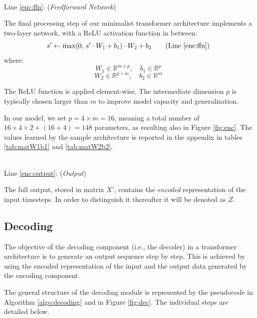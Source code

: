 \documentclass[algorithms,article,submit,pdftex,moreauthors]{Definitions/mdpi}
\begin{document}
~\\Line \ref{enc:ffn}: (\textit{Feedforward Network})

The final processing step of our minimalist transformer architecture implements a two-layer network, with a ReLU activation function in between:
\begin{equation}
    s' \leftarrow \text{max}(0,\,s'\cdot W_1 + b_1) \cdot W_2 + b_2
\tag{Line \ref{enc:ffn}}
\end{equation}
where:
$$
    W_1 \in \mathbb{R}^{m \times p},\quad
    b_1 \in \mathbb{R}^{p}
$$ $$
    W_2 \in \mathbb{R}^{p \times m},\quad
    b_2 \in \mathbb{R}^m
$$

The ReLU function is applied element-wise. The intermediate dimension $p$ is typically chosen larger than $m$ to improve model capacity and generalization. 

In our model, we set $p = 4 \times m = 16$, meaning a total number of $16 \times 4 \times 2 + (16 + 4) = 148$ parameters, as resulting also in Figure \ref{fig:enc}.
The values learned by the sample architecture is reported in the appendix in tables \ref{tab:matW1b1} and \ref{tab:matW2b2}.

~\\Line \ref{enc:output}: (\textit{Output})

The full output, stored in matrix $X'$, contains the \textit{encoded} representation of the input timesteps. In order to distinguish it thereafter it will be denoted as $Z$. 

\subsection{Decoding} \label{subsec:decoding}

The objective of the decoding component (i.e., the decoder) in a transformer architecture is to generate an output sequence step by step. This is achieved by using the encoded representation of the input and the output data generated by the encoding component.

The general structure of the decoding module is represented by the pseudocode in Algorithm \ref{algo:decoding} and in Figure \ref{fig:dec}. The individual steps are detailed below.
\end{document}
